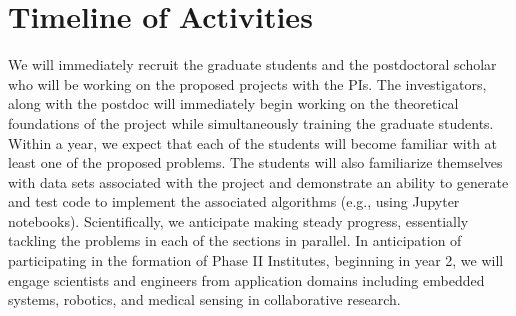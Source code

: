 \section{Timeline of Activities}
We will immediately recruit the graduate students and the postdoctoral scholar who will be working on the proposed projects with the PIs. The investigators, along with the postdoc will immediately begin working on the theoretical foundations of the project while simultaneously training the graduate students. Within a year, we expect that each of the students will become familiar with at least one of the proposed problems. The students will also familiarize themselves with data sets associated with the project and demonstrate an ability to generate and test code to implement the associated algorithms (e.g., using Jupyter notebooks). Scientifically, we anticipate making steady progress, essentially tackling the problems in each of the sections in parallel. In anticipation of participating in the formation of Phase II Institutes, beginning in year 2, we will  engage scientists and engineers from application domains including embedded systems, robotics, and medical sensing in collaborative research. 